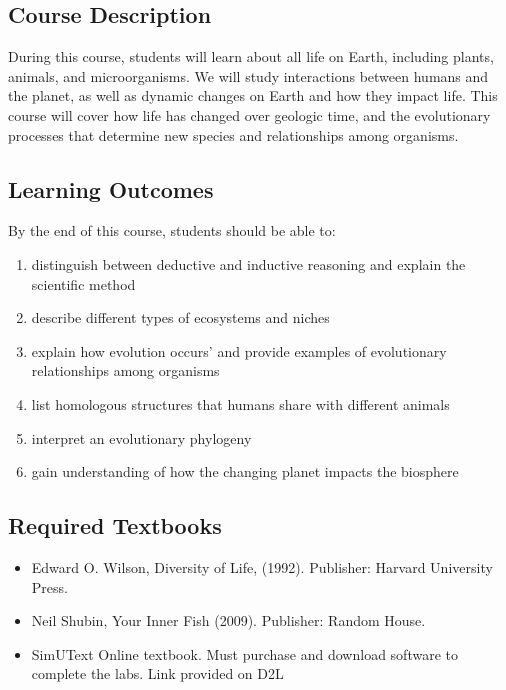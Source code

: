 \documentclass{tufte-handout}
\begin{document}
\begin{fullwidth}

\section{Course Description}

During this course, students will learn about all life on Earth, including plants, animals, and microorganisms. We will study interactions between humans and the planet, as well as dynamic changes on Earth and how they impact life. This course will cover how life has changed over geologic time, and the evolutionary processes that determine new species and relationships among organisms.

\subsection{Learning Outcomes}

By the end of this course, students should be able to:  

\begin{enumerate}
	\item distinguish between deductive and inductive reasoning and explain the scientific method
	\item describe different types of ecosystems and niches
	\item explain how evolution occurs’ and provide examples of evolutionary relationships among organisms
	\item list homologous structures that humans share with different animals
	\item interpret an evolutionary phylogeny
	\item gain understanding of how the changing planet impacts the biosphere
\end{enumerate}

\subsection{Required Textbooks}

\begin{itemize}
	\item Edward O. Wilson, Diversity of Life, (1992). Publisher: Harvard University Press.
	\item Neil Shubin, Your Inner Fish (2009). Publisher: Random House.
	\item SimUText Online textbook. Must purchase and download software to complete the labs. Link provided on D2L
\end{itemize}


\end{fullwidth}
\end{document}
